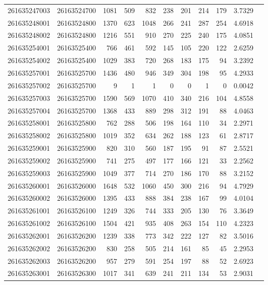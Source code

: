\documentclass[11pt,landscape]{article}
\begin{document}
{\begin{longtable}[]{@{}lrrrrrrrrrr@{}}
261635247003 & 26163524700 & 1081 & 509 & 832 & 238 & 201 & 214 & 179 & 3.7329 \\
261635248001 & 26163524800 & 1370 & 623 & 1048 & 266 & 241 & 287 & 254 & 4.6918 \\
261635248002 & 26163524800 & 1216 & 551 & 910 & 270 & 225 & 240 & 175 & 4.0851 \\
261635254001 & 26163525400 & 766 & 461 & 592 & 145 & 105 & 220 & 122 & 2.6259 \\
261635254002 & 26163525400 & 1029 & 383 & 720 & 268 & 183 & 175 & 94 & 3.2392 \\
261635257001 & 26163525700 & 1436 & 480 & 946 & 349 & 304 & 198 & 95 & 4.2933 \\
261635257002 & 26163525700 & 9 & 1 & 1 & 0 & 0 & 1 & 0 & 0.0042 \\
261635257003 & 26163525700 & 1590 & 569 & 1070 & 410 & 340 & 216 & 104 & 4.8558 \\
261635257004 & 26163525700 & 1368 & 433 & 889 & 298 & 312 & 191 & 88 & 4.0463 \\
261635258001 & 26163525800 & 762 & 288 & 506 & 198 & 164 & 110 & 34 & 2.2971 \\
261635258002 & 26163525800 & 1019 & 352 & 634 & 262 & 188 & 123 & 61 & 2.8717 \\
261635259001 & 26163525900 & 820 & 310 & 560 & 187 & 195 & 91 & 87 & 2.5521 \\
261635259002 & 26163525900 & 741 & 275 & 497 & 177 & 166 & 121 & 33 & 2.2562 \\
261635259003 & 26163525900 & 1049 & 377 & 714 & 270 & 186 & 170 & 88 & 3.2152 \\
261635260001 & 26163526000 & 1648 & 532 & 1060 & 450 & 300 & 216 & 94 & 4.7929 \\
261635260002 & 26163526000 & 1395 & 433 & 888 & 384 & 238 & 167 & 99 & 4.0104 \\
261635261001 & 26163526100 & 1249 & 326 & 744 & 333 & 205 & 130 & 76 & 3.3649 \\
261635261002 & 26163526100 & 1504 & 421 & 935 & 408 & 263 & 154 & 110 & 4.2323 \\
261635262001 & 26163526200 & 1239 & 338 & 773 & 342 & 222 & 127 & 82 & 3.5016 \\
261635262002 & 26163526200 & 830 & 258 & 505 & 214 & 161 & 85 & 45 & 2.2953 \\
261635262003 & 26163526200 & 957 & 279 & 591 & 254 & 197 & 88 & 52 & 2.6923 \\
261635263001 & 26163526300 & 1017 & 341 & 639 & 241 & 211 & 134 & 53 & 2.9031 \\

\end{longtable}}
\end{document}

